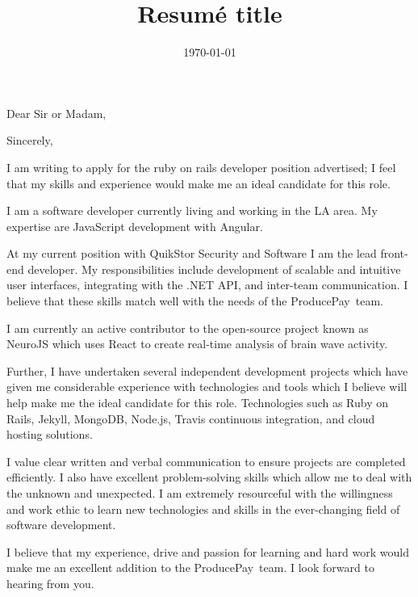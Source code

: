 \documentclass[11pt,a4paper,sans]{moderncv}        %
\title{Resumé title}                               %
\newcommand{\company}{ProducePay}
\begin{document}
\recipient{\company}{}
\date{\today}
\opening{Dear Sir or Madam,}
\closing{Sincerely,}
\makelettertitle

I am writing to apply for the ruby on rails developer position advertised; I feel that my skills and experience would make me an ideal candidate for this role.

I am a software developer currently living and working in the LA area.
My expertise are JavaScript development with Angular.

At my current position with QuikStor Security and Software  I am the lead front-end developer. 
My responsibilities include development of scalable and intuitive user interfaces, integrating with the .NET API, and inter-team communication.
I believe that these skills match well with the needs of the \company~team.

I am currently an active contributor to the open-source project known as NeuroJS which uses React to create real-time analysis of brain wave activity.

Further, I have undertaken several independent development projects which have given me considerable experience with technologies and tools which I believe will help make me the ideal candidate for this role. 
Technologies such as Ruby on Rails, Jekyll, MongoDB, Node.js, Travis continuous integration, and cloud hosting solutions.


I value clear written and verbal communication to ensure projects are completed efficiently. 
I also have excellent problem-solving skills which allow me to deal with the unknown and unexpected. 
I am extremely resourceful with the willingness and work ethic to learn new technologies and skills in the ever-changing field of software development.

I believe that my experience, drive and passion for learning and hard work would make me an excellent addition to the \company~team. 
I look forward to hearing from you.

\makeletterclosing
\end{document}
